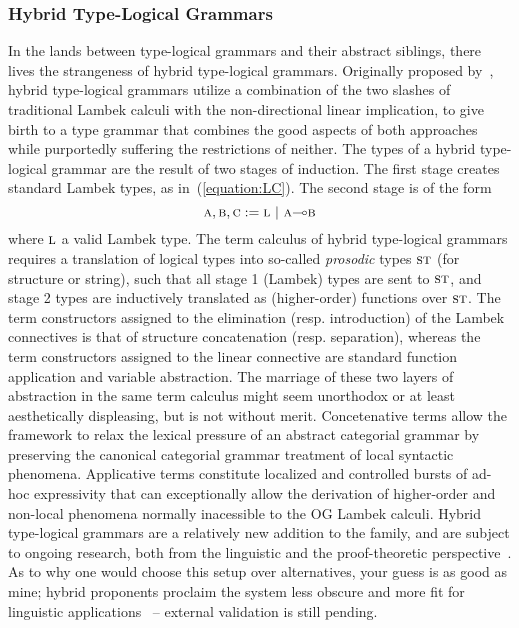 \subsubsection{Hybrid Type-Logical Grammars}
In the lands between type-logical grammars and their abstract siblings, there lives the strangeness of hybrid type-logical grammars.
Originally proposed by~\citet{kubota2012gapping}, hybrid type-logical grammars utilize a combination of the two slashes of traditional Lambek calculi with the non-directional linear implication, to give birth to a type grammar that combines the good aspects of both approaches while purportedly suffering the restrictions of neither.
The types of a hybrid type-logical grammar are the result of two stages of induction.
The first stage creates standard Lambek types, as in~(\ref{equation:LC}).
The second stage is of the form 
\begin{equation}
	\prop{a}, \prop{b}, \prop{c} := \prop{l} \ | \ \prop{a} \li \prop{b}
\end{equation}
where $\normalfont\textsc{l}$ a valid Lambek type.
The term calculus of hybrid type-logical grammars requires a translation of logical types into so-called \textit{prosodic} types $\normalfont\textsc{st}$ (for structure or string), such that all stage 1 (Lambek) types are sent to $\normalfont\textsc{st}$, and stage 2 types are inductively translated as (higher-order) functions over $\normalfont\textsc{st}$. 
The term constructors assigned to the elimination (resp. introduction) of the Lambek connectives is that of structure concatenation (resp. separation), whereas the term constructors assigned to the linear connective are standard function application and variable abstraction.
The marriage of these two layers of abstraction in the same term calculus might seem unorthodox or at least aesthetically displeasing, but is not without merit.
Concetenative terms allow the framework to relax the lexical pressure of an abstract categorial grammar by preserving the canonical categorial grammar treatment of local syntactic phenomena.
Applicative terms constitute localized and controlled bursts of ad-hoc expressivity that can exceptionally allow the derivation of higher-order and non-local phenomena normally inacessible to the OG Lambek calculi.
Hybrid type-logical grammars are a relatively new addition to the family, and are subject to ongoing research, both from the linguistic and the proof-theoretic perspective~\cite{kubota2020type,moot2022logical}.
As to why one would choose this setup over alternatives, your guess is as good as mine; hybrid proponents proclaim the system less obscure and more fit for linguistic applications~\cite{kubota2020type} -- external validation is still pending.


